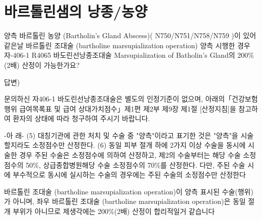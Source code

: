 \section{바르톨린샘의 낭종/농양}
%
{양측 바르톨린 농양 (Bartholin's Gland Abscess)( N750/N751/N758/N759 )이 있어 같은날 바르톨린 조대술 (bartholine marsupialization operation) 양측 시행한 경우 
자-406-1 R4065 바도린선낭종조대술 Marsupialization of Batholin's Gland의 200\%(2배) 산정이 가능한가요? \par

답변) \par
문의하신 자406-1 바도린선낭종조대술은 별도의 인정기준이 없으며, 아래의「건강보험 행위 급여 목록표 및 급여 상대가치점수」제1편 제2부 제9장 제1절 [산정지침]을 참고하여 환자의 상태에 따라 청구하여 주시기 바랍니다.

-아 래-
(5) 대칭기관에 관한 처치 및 수술 중 "양측"이라고 표기한 것은 "양측"을 시술할지라도 소정점수만 산정한다. 
(6) 동일 피부 절개 하에 2가지 이상 수술을 동시에 시술한 경우 주된 수술은 소정점수에 의하여 산정하고, 제2의 수술부터는 해당 수술 소정점수의 50\%, 상급종합병원 해당 수술 소정점수의 70\%를 산정한다. 다만, 주된 수술 시에 부수적으로 동시에 실시하는 수술의 경우에는 주된 수술의 소정점수만 산정한다
\par 
바르톨린 조대술 (bartholine marsupialization operation)이 양측 표시된 수술(행위)가 아니며,  좌우  바르톨린 조대술 (bartholine marsupialization operation)은 동일 절개 부위가 아니므로 제생각에는  200\%(2배) 산정이 합리적일거 같습니다
}